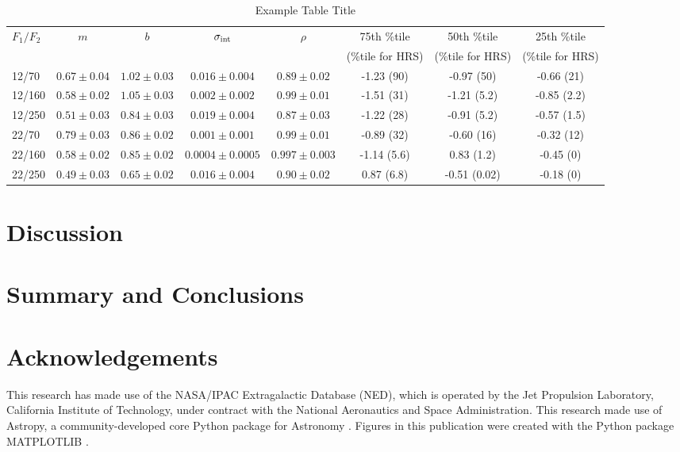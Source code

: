 \documentclass[fleqn, usenatbib]{mnras}
\begin{document}
\begin{table*}
\begin{threeparttable}
\captionsetup{font=small,labelfont=bf,labelsep=period}
\caption{Example Table Title}
\begin{tabular}{lccccccc}
\toprule 
$F_{1}/F_{2}$ & $m$ & $b$  & $\sigma_{\rm int}$ & $\rho$ & 75th \%tile  & 50th \%tile  & 25th \%tile\\
&&&&&(\%tile for HRS)&(\%tile for HRS)&(\%tile for HRS)\\
\midrule
12/70      & $0.67\pm0.04$ & $1.02\pm0.03$ & $0.016\pm0.004$ & $0.89\pm0.02$ & -1.23 (90) & -0.97 (50) & -0.66 (21)\\
12/160    & $0.58\pm0.02$ & $1.05\pm0.03$ & $0.002\pm0.002$ & $0.99\pm0.01$ & -1.51 (31) & -1.21 (5.2) & -0.85 (2.2)\\
12/250    & $0.51\pm0.03$ & $0.84\pm0.03$ & $0.019\pm0.004$ & $0.87\pm0.03$ & -1.22 (28) &  -0.91 (5.2) & -0.57 (1.5)\\
22/70      & $0.79\pm0.03$ & $0.86\pm0.02$ & $0.001\pm0.001$ & $0.99\pm0.01$ & -0.89 (32) & -0.60 (16) & -0.32 (12)\\
22/160    & $0.58\pm0.02$ & $0.85\pm0.02$ & $0.0004\pm0.0005$ & $0.997\pm0.003$ & -1.14 (5.6) & 0.83 (1.2) & -0.45 (0)\\
22/250    & $0.49\pm0.03$ & $0.65\pm0.02$ & $0.016\pm0.004$ & $0.90\pm0.02$ & 0.87 (6.8) & -0.51 (0.02) & -0.18 (0) \\
\bottomrule
\end{tabular}
\end{threeparttable}
\end{table*}
\section{Discussion}

\section{Summary and Conclusions}

\section*{Acknowledgements}
This research has made use of the NASA/IPAC Extragalactic Database (NED), which is operated by the Jet Propulsion Laboratory, California Institute of Technology, under contract with the National Aeronautics and Space Administration. This research made use of Astropy, a community-developed core Python package for Astronomy \citep{Astropy:2013ek}. Figures in this publication were created with the Python package \textsc{MATPLOTLIB} \citep{Hunter:2007}. 
\end{document}

